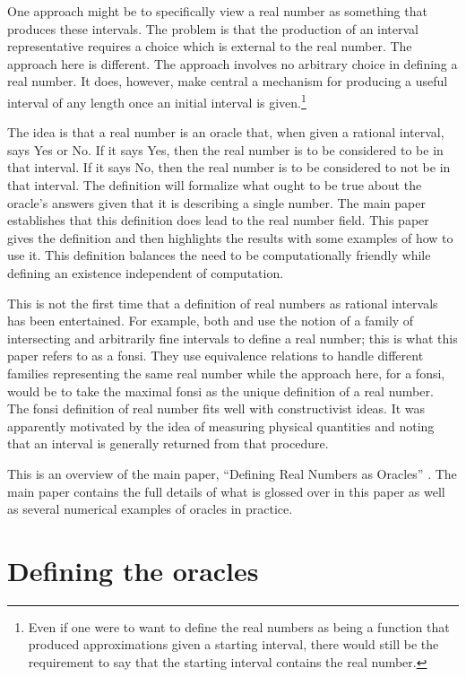 \documentclass[12pt]{article}
\begin{document}
One approach might be to specifically view a real number as something that produces these intervals. The problem is that the production of an interval representative requires a choice which is external to the real number. The approach here is different. The approach involves no arbitrary choice in defining a real number. It does, however, make central a mechanism for producing a useful interval of any length once an initial interval is given.\footnote{Even if one were to want to define the real numbers as being a function that produced approximations given a starting interval, there would still be the requirement to say that the starting interval contains the real number.}

The idea is that a real number is an oracle that, when given a rational interval, says Yes or No. If it says Yes, then the real number is to be considered to be in that interval. If it says No, then the real number is to be considered to not be in that interval. The definition will formalize what ought to be true about the oracle's answers given that it is describing a single number. The main paper establishes that this definition does lead to the real number field. This paper gives the definition and then highlights the results with some examples of how to use it. This definition balances the need to be computationally friendly while defining an existence independent of computation. 

This is not the first time that a definition of real numbers as rational intervals has been entertained. For example, both \cite{bridger} and \cite{bridges} use the notion of a family of intersecting and arbitrarily fine intervals to define a real number; this is what this paper refers to as a fonsi. They use equivalence relations to handle different families representing the same real number while the approach here, for a fonsi, would be to take the maximal fonsi as the unique definition of a real number. The fonsi definition of real number fits well with constructivist ideas. It was apparently motivated by the idea of measuring physical quantities and noting that an interval is generally returned from that procedure. 

This is an overview of the main paper, ``Defining Real Numbers as Oracles'' \cite{taylor23main}. The main paper contains the full details of what is glossed over in this paper as well as several numerical examples of oracles in practice. 

\section{Defining the oracles}\label{sec:ora}
\end{document}
